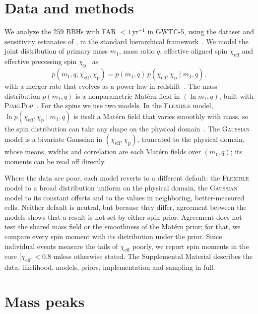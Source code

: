 \documentclass[%
 reprint,
 amsmath,amssymb,
 aps,
 prl,
 nofootinbib,nobibnotes,
 floatfix,
]{revtex4-2}
\newcommand{\chieff}{\ensuremath{\chi_{\mathrm{eff}}}}
\newcommand{\chip}{\ensuremath{\chi_{\mathrm{p}}}}
\newcommand{\peryear}{\ensuremath{\,\mathrm{yr}^{-1}}}
\newcommand{\PixelPop}{\textsc{PixelPop}\xspace}
\newcommand{\flexiblespins}{\textsc{Flexible}\xspace}
\newcommand{\gaussianspins}{\textsc{Gaussian}\xspace}
\begin{document}
\section{Data and methods}

We analyze the 259 \acp{BBH} with \ac{FAR} $< 1\peryear$ in \ac{GWTC-5}, using the dataset and sensitivity estimates of \citet{LIGOScientific:2026ctl}, in the standard hierarchical framework~\cite{Mandel:2018mve, Thrane:2018qnx}. We model the joint distribution of primary mass $m_1$, mass ratio $q$, effective aligned spin $\chieff$ and effective precessing spin $\chip$~\cite{Racine:2008qv, Schmidt:2014iyl} as
\begin{equation}
    p(m_1, q, \chieff, \chip) = p(m_1, q)\, p(\chieff, \chip \mid m_1, q),
\end{equation}
with a merger rate that evolves as a power law in redshift~\cite{Fishbach:2018edt}. The mass distribution $p(m_1, q)$ is a nonparametric Mat\'ern field in $(\ln m_1, q)$, built with \PixelPop~\cite{Heinzel:2024jlc}. For the spins we use two models. In the \flexiblespins model, $\ln p(\chieff, \chip \mid m_1, q)$ is itself a Mat\'ern field that varies smoothly with mass, so the spin distribution can take any shape on the physical domain~\cite{iwaya_analytic_2025}. The \gaussianspins model is a bivariate Gaussian in $(\chieff, \chip)$, truncated to the physical domain, whose means, widths and correlation are each Mat\'ern fields over $(m_1, q)$; its moments can be read off directly.

Where the data are poor, each model reverts to a different default: the \flexiblespins model to a broad distribution uniform on the physical domain, the \gaussianspins model to its constant offsets and to the values in neighboring, better-measured cells. Neither default is neutral, but because they differ, agreement between the models shows that a result is not set by either spin prior. Agreement does not test the shared mass field or the smoothness of the Mat\'ern prior; for that, we compare every spin moment with its distribution under the prior. Since individual events measure the tails of $\chieff$ poorly, we report spin moments in the core $|\chieff| < 0.8$ unless otherwise stated. The Supplemental Material describes the data, likelihood, models, priors, implementation and sampling in full.

\section{Mass peaks}
\end{document}
